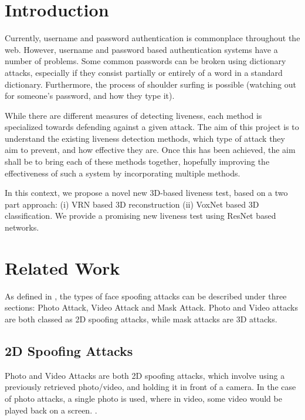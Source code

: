 \documentclass[11pt,a4paper]{article}
\begin{document}
\section{Introduction}
    Currently, username and password authentication is commonplace throughout the web. However, username and password
    based authentication systems have a number of problems. Some common passwords can be broken using dictionary attacks,
    especially if they consist partially or entirely of a word in a standard dictionary. Furthermore, the process of shoulder surfing is possible (watching out
    for someone's password, and how they type it).

   While there are different measures of detecting liveness, each method is specialized towards defending against a given attack. The aim of this project is to understand
   the existing liveness detection methods, which type of attack they aim to prevent, and how effective they are. Once this has been achieved, the aim shall be to bring
   each of these methods together, hopefully improving the effectiveness of such a system by incorporating multiple methods.


    In this context, we propose a novel new 3D-based liveness test, based on a two part approach: (i) VRN based 3D reconstruction (ii) VoxNet based 3D classification.
    We provide a promising new liveness test using ResNet based networks.

\section{Related Work}
    As defined in \cite{FaceSpoofingAttacksStudy}, the types of face spoofing attacks can be described under three sections: Photo Attack, Video Attack and Mask Attack.
    Photo and Video attacks are both classed as 2D spoofing attacks, while mask attacks are 3D attacks.

    \subsection{2D Spoofing Attacks}
        Photo and Video Attacks are both 2D spoofing attacks, which involve using a previously retrieved photo/video, and holding it in front of a camera. In the case of photo attacks,
        a single photo is used, where in video, some video would be played back on a screen. \cite{FaceSpoofingAttacksStudy}.
\end{document}
